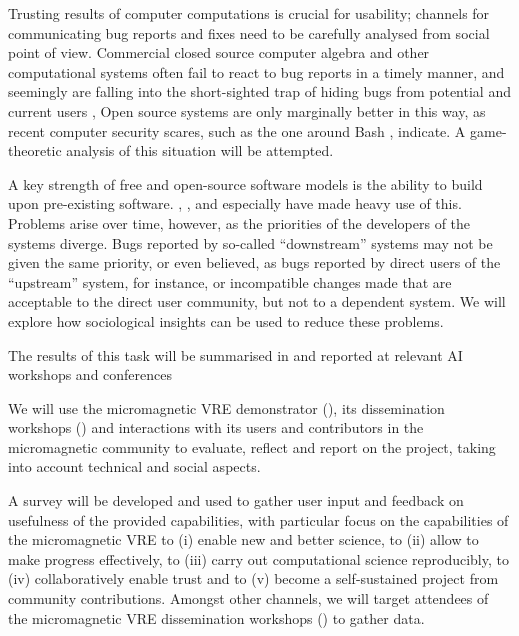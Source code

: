 \begin{workpackage}[id=social-aspects,wphases=0-48,
  title=Social Aspects,
  lead=UO,
  UORM=23,USHRM=18,USORM=6]
\begin{tasklist}
\begin{task}[title=Mechanism Design for free software development,PM=15,lead=UO,
id=isocial-decisionmaking]
 Trusting results of computer computations is crucial for
usability; channels for communicating bug reports and fixes need to be
carefully analysed from social point of view.  Commercial closed
source computer algebra and other computational systems often fail to
react to bug reports in a timely manner, and seemingly are falling
into the short-sighted trap of hiding bugs from potential and current
users \cite{misfort}, Open source systems are only marginally better
in this way, as recent computer security scares, such as the one
around Bash \cite{shellshock}, indicate.  A game-theoretic analysis of
this situation will be attempted.


A key strength of free and open-source software models is the ability
to build upon pre-existing software. \GAP, \PariGP, \Singular and
especially \Sage have made heavy use of this. Problems arise over
time, however, as the priorities of the developers of the systems
diverge. Bugs reported by so-called ``downstream'' systems may not be
given the same priority, or even believed, as bugs reported by direct
users of the ``upstream'' system, for instance, or incompatible
changes made that are acceptable to the direct user community, but not
to a dependent system. We will explore how sociological insights can
be used to reduce these problems.

The results of this task will be summarised in 
and reported at relevant AI workshops and conferences
\end{task}

\begin{task}[title=Evaluation of Micromagnetic VRE,lead=USO,PM=6,
id=oommf-nb-evaluation,partners={UO,PS}]
  We will use the micromagnetic VRE demonstrator
  (), its dissemination
  workshops \linebreak()
  and interactions with its users and contributors in the
  micromagnetic community to evaluate, reflect and report on the project,
  taking into account technical and social aspects.

  A survey will be developed and used to gather user input and
  feedback on usefulness of the provided capabilities, with particular
  focus on the capabilities of the micromagnetic VRE to (i) enable new
  and better science, to (ii) allow to make progress effectively, to
  (iii) carry out computational science reproducibly, to (iv)
  collaboratively enable trust and to (v) become a self-sustained
  project from community contributions. Amongst other channels, we
  will target attendees of the micromagnetic VRE dissemination
  workshops () to
  gather data.


\end{task}
\end{tasklist}
\end{workpackage}
